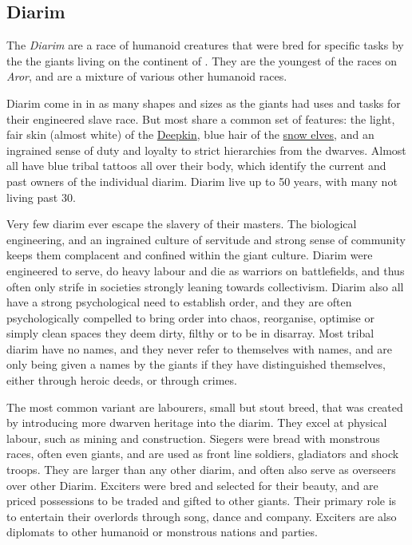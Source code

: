 \subsection{Diarim}
\label{sec:Diarim}


The \emph{Diarim} are a race of humanoid creatures that were bred for specific
tasks by the the giants living on the continent of . They
are the youngest of the races on \emph{Aror}, and are a mixture of various
other humanoid races.

Diarim come in in as many shapes and sizes as the giants had uses and tasks
for their engineered slave race. But most share a common set of features: the
light, fair skin (almost white) of the \hyperref[sec:Deepkin]{Deepkin}, blue
hair of the \hyperref[sec:Snow Elves]{snow elves}, and an ingrained sense of
duty and loyalty to strict hierarchies from the dwarves. Almost all have blue
tribal tattoos all over their body, which identify the current and past owners
of the individual diarim. Diarim live up to 50 years, with many not living
past 30.

Very few diarim ever escape the slavery of their masters. The biological
engineering, and an ingrained culture of servitude and strong sense of
community keeps them complacent and confined within the giant culture. Diarim
were engineered to serve, do heavy labour and die as warriors on battlefields,
and thus often only strife in societies strongly leaning towards
collectivism. Diarim also all have a strong psychological need to establish
order, and they are often psychologically compelled to bring order into chaos,
reorganise, optimise or simply clean spaces they deem dirty, filthy or to be
in disarray. Most tribal diarim have no names, and they never refer to
themselves with names, and are only being given a names by the giants if they
have distinguished themselves, either through heroic deeds, or through crimes.

The most common variant are labourers, small but stout breed, that was created
by introducing more dwarven heritage into the diarim. They excel at physical
labour, such as mining and construction. Siegers were bread with monstrous
races, often even giants, and are used as front line soldiers, gladiators and
shock troops. They are larger than any other diarim, and often also serve as
overseers over other Diarim. Exciters were bred and selected for their beauty,
and are priced possessions to be traded and gifted to other giants. Their
primary role is to entertain their overlords through song, dance and company.
Exciters are also diplomats to other humanoid or monstrous nations and parties.

